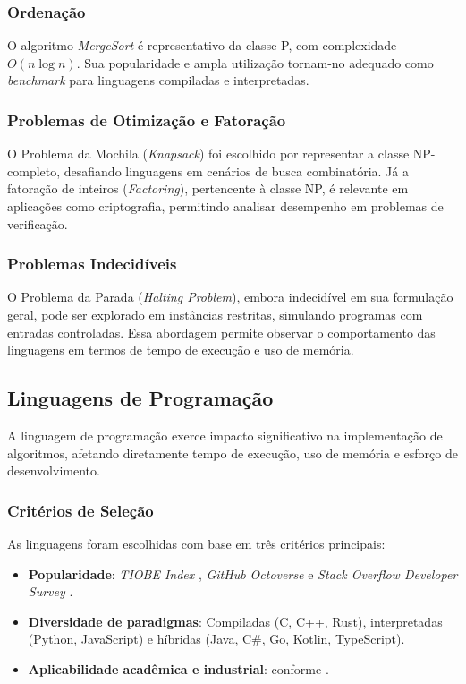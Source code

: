 \documentclass[12pt,a4paper]{article}
\newcommand{\eng}[1]{\textit{#1}}
\begin{document}
\subsubsection{Ordenação}
O algoritmo \eng{MergeSort} é representativo da classe P, com complexidade \(O(n \log n)\). Sua popularidade e ampla utilização tornam-no adequado como \eng{benchmark} para linguagens compiladas e interpretadas.

\subsubsection{Problemas de Otimização e Fatoração}
O Problema da Mochila (\eng{Knapsack}) foi escolhido por representar a classe NP-completo, desafiando linguagens em cenários de busca combinatória. Já a fatoração de inteiros (\eng{Factoring}), pertencente à classe NP, é relevante em aplicações como criptografia, permitindo analisar desempenho em problemas de verificação.

\subsubsection{Problemas Indecidíveis}
O Problema da Parada (\eng{Halting Problem}), embora indecidível em sua formulação geral, pode ser explorado em instâncias restritas, simulando programas com entradas controladas. Essa abordagem permite observar o comportamento das linguagens em termos de tempo de execução e uso de memória.

\subsection{Linguagens de Programação}
A linguagem de programação exerce impacto significativo na implementação de algoritmos, afetando diretamente tempo de execução, uso de memória e esforço de desenvolvimento.

\subsubsection{Critérios de Seleção}
As linguagens foram escolhidas com base em três critérios principais:
\begin{itemize}
  \item \textbf{Popularidade}: \eng{TIOBE Index} , \eng{GitHub Octoverse}  e \eng{Stack Overflow Developer Survey} .
  \item \textbf{Diversidade de paradigmas}: Compiladas (C, C++, Rust), interpretadas (Python, JavaScript) e híbridas (Java, C\#, Go, Kotlin, TypeScript).
  \item \textbf{Aplicabilidade acadêmica e industrial}: conforme .
\end{itemize}
\end{document}

